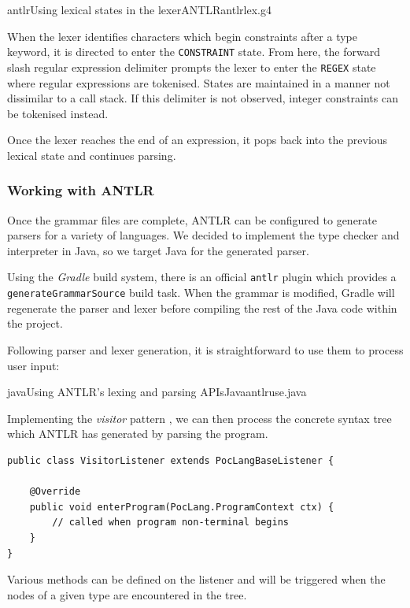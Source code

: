 \documentclass[a4paper,openany,12pt]{book}
\begin{document}
\newsavebox\myvlex

\begin{lrbox}{\myvlex}\begin{minipage}{\textwidth}
  \begin{mycodefile}{antlr}{\label{code:antlr:1}Using lexical states in the lexer}{ANTLR}{antlrlex.g4}
  \end{mycodefile}
\end{minipage}\end{lrbox}




When the lexer identifies characters which begin constraints after a type keyword, it is directed to enter the
\texttt{CONSTRAINT} state.
From here, the forward slash regular expression delimiter prompts the lexer to enter the \texttt{REGEX} state where
regular expressions are tokenised.
States are maintained in a manner not dissimilar to a call stack.
If this delimiter is not observed, integer constraints can be tokenised instead.

Once the lexer reaches the end of an expression, it pops back into the previous lexical state and continues parsing.

\subsubsection{Working with ANTLR}

Once the grammar files are complete, ANTLR can be configured to generate parsers for a variety of languages.
We decided to implement the type checker and interpreter in Java, so we target Java for the generated parser.

Using the \emph{Gradle} build system, there is an official \texttt{antlr} plugin which provides a
\texttt{generateGrammarSource} build task.
When the grammar is modified, Gradle will regenerate the parser and lexer before compiling the rest of the Java
code within the project.

Following parser and lexer generation, it is straightforward to use them to process user input:

\begin{mycodefile}{java}{\label{code:antlr:2}Using ANTLR's lexing and parsing APIs}{Java}{antlruse.java}
    \vspace{0.5em}

    Implementing the \emph{visitor} pattern \citep{gof1995}, we can then process the concrete syntax tree which ANTLR
    has generated by parsing the program.
    \vspace{0.5em}

    \begin{verbatim}
public class VisitorListener extends PocLangBaseListener {

    @Override
    public void enterProgram(PocLang.ProgramContext ctx) {
        // called when program non-terminal begins
    }
}
    \end{verbatim}
    Various methods can be defined on the listener and will be triggered when the nodes of a given type are encountered
    in the tree.
\end{mycodefile}
\end{document}
